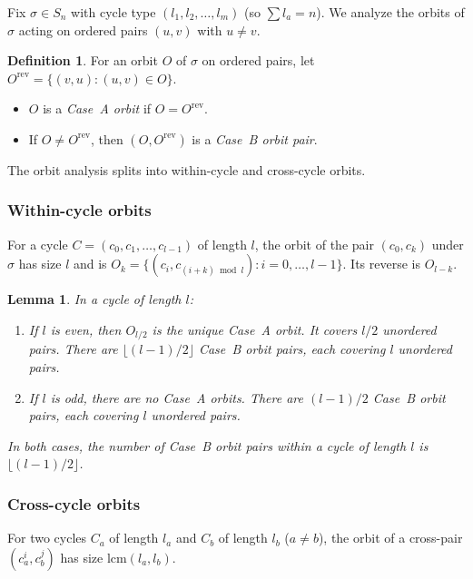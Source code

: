 \documentclass[12pt,reqno]{amsart}
\newtheorem{lemma}[theorem]{Lemma}
\theoremstyle{definition}
\newtheorem{definition}[theorem]{Definition}
\theoremstyle{plain}
\newcommand{\lcm}{\mathrm{lcm}}
\newcommand{\floor}[1]{\lfloor #1 \rfloor}
\begin{document}
Fix $\sigma\in S_n$ with cycle type $(l_1,l_2,\ldots,l_m)$ (so $\sum l_a=n$).
We analyze the orbits of $\sigma$ acting on ordered pairs $(u,v)$ with $u\ne v$.

\begin{definition}
For an orbit $O$ of $\sigma$ on ordered pairs, let $O^{\mathrm{rev}}=\{(v,u):(u,v)\in O\}$.
\begin{itemize}
\item $O$ is a \emph{Case~A orbit} if $O=O^{\mathrm{rev}}$.
\item If $O\ne O^{\mathrm{rev}}$, then $(O,O^{\mathrm{rev}})$ is a \emph{Case~B orbit pair}.
\end{itemize}
\end{definition}

The orbit analysis splits into within-cycle and cross-cycle orbits.

\subsubsection{Within-cycle orbits}

For a cycle $C=(c_0,c_1,\ldots,c_{l-1})$ of length $l$, the orbit of the pair
$(c_0,c_k)$ under $\sigma$ has size $l$ and is
$O_k=\{(c_i,c_{(i+k)\bmod l}):i=0,\ldots,l-1\}$.
Its reverse is $O_{l-k}$.

\begin{lemma}\label{lem:within-cycle}
In a cycle of length $l$:
\begin{enumerate}
\item If $l$ is even, then $O_{l/2}$ is the unique Case~A orbit.  It covers
  $l/2$ unordered pairs.  There are $\floor{(l-1)/2}$ Case~B orbit pairs,
  each covering $l$ unordered pairs.
\item If $l$ is odd, there are no Case~A orbits.  There are $(l-1)/2$ Case~B
  orbit pairs, each covering $l$ unordered pairs.
\end{enumerate}
In both cases, the number of Case~B orbit pairs within a cycle of length $l$ is
$\floor{(l-1)/2}$.
\end{lemma}

\subsubsection{Cross-cycle orbits}

For two cycles $C_a$ of length $l_a$ and $C_b$ of length $l_b$ ($a\ne b$),
the orbit of a cross-pair $(c_a^i,c_b^j)$ has size $\lcm(l_a,l_b)$.
\end{document}

